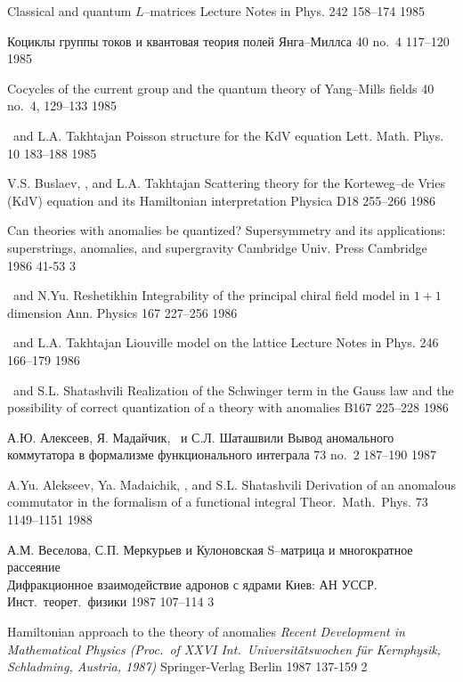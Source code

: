 {\LF}
{Classical and quantum {$L$}--matrices}
{Lecture Notes in Phys.} {242} {} {158--174} {1985}

{\LD}
{Коциклы группы токов и квантовая теория полей Янга--Миллса}
{\UMN} {40} {no.~4} {117--120} {1985}

{\LF}
{Cocycles of the current group and the quantum theory of
  Yang--Mills fields}
{\RMS} {40} {no.~4, 129--133} {1985}

{\LF\ and L.A. Takhtajan}
{Poisson structure for the {K}d{V} equation}
{Lett. Math. Phys.} {10} {} {183--188} {1985}

{V.S. Buslaev, \LF, and L.A. Takhtajan}
{Scattering theory for the {K}orteweg--de Vries (KdV) equation
  and its {H}amiltonian interpretation}
{Physica} {D18} {} {255--266} {1986}

{\LF}
{Can theories with anomalies be quantized?}
{Supersymmetry and its applications: superstrings, anomalies, and
 supergravity} {Cambridge Univ. Press} {Cambridge} {1986} {} {41-53} {3}

{\LF\ and N.Yu. Reshetikhin}
{Integrability of the principal chiral field model in {$1+1$} dimension}
{Ann. Physics} {167} {} {227--256} {1986}

{\LF\ and L.A. Takhtajan}
{Liouville model on the lattice}
{Lecture Notes in Phys.} {246} {} {166--179} {1986}

{\LF\ and  S.L. Shatashvili}
{Realization of the Schwinger term in the Gauss law
and the possibility of correct quantization of a
theory with anomalies}
{\PL} {B167} {} {225--228} {1986}

{А.Ю. Алексеев, Я. Мадайчик, \LD\ и С.Л. Шаташвили}
{Вывод аномального коммутатора в формализме функционального интеграла}
{\TMF} {73} {no.~2} {187--190} {1987}

{A.Yu. Alekseev, Ya. Mada{i}chik, \LF, and S.L. Shatashvili}
{Derivation of an anomalous commutator in the formalism of a
  functional integral}
{Theor.\ Math.\ Phys.} {73} {1149--1151} {1988}

{А.М. Веселова, С.П. Меркурьев и \LD} 
{Кулоновская S--матрица и многократное рассеяние} \\
{Дифракционное взаимодействие адронов с ядрами}
{Киев: АН УССР. Инст.\ теорет.\ физики} {} {1987} {} {107--114} {3}

{\LF}
{Hamiltonian approach to the theory of anomalies}
{\em Recent Development in Mathematical Physics
(Proc.\ of XXVI Int.\ Universit\"atswochen f\"ur
Kernphysik, Schladming, Austria, 1987)}
{Springer-Verlag} {Berlin} {1987} {} {137-159} {2}

